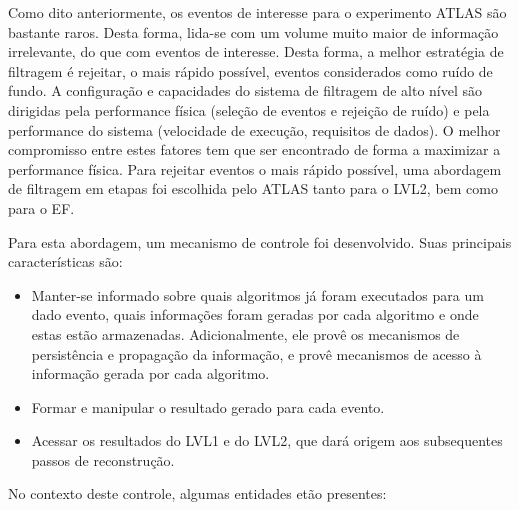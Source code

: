 Como dito anteriormente, os eventos de interesse para o experimento ATLAS são bastante raros. Desta forma, lida-se com um volume muito maior de informação irrelevante, do que com eventos de interesse. Desta forma, a melhor estratégia de filtragem é rejeitar, o mais rápido possível, eventos considerados como ruído de fundo. A configuração e capacidades do sistema de filtragem de alto nível são dirigidas pela performance física (seleção de eventos e rejeição de ruído) e pela performance do sistema (velocidade de execução, requisitos de dados). O melhor compromisso entre estes fatores tem que ser encontrado de forma a maximizar a performance física. Para rejeitar eventos o mais rápido possível, uma abordagem de filtragem em etapas foi escolhida pelo ATLAS tanto para o LVL2, bem como para o EF. 

Para esta abordagem, um mecanismo de controle foi desenvolvido. Suas principais características são:

\begin{itemize}

\item Manter-se informado sobre quais algoritmos já foram executados para um dado evento, quais informações foram geradas por cada algoritmo e onde estas estão armazenadas. Adicionalmente, ele provê os mecanismos de persistência e propagação  da informação, e provê mecanismos de acesso à informação gerada por cada algoritmo.

\item Formar e manipular o resultado gerado para cada evento.

\item Acessar os resultados do LVL1 e do LVL2, que dará origem aos subsequentes passos de reconstrução.

\end{itemize}

No contexto deste controle, algumas entidades etão presentes:

